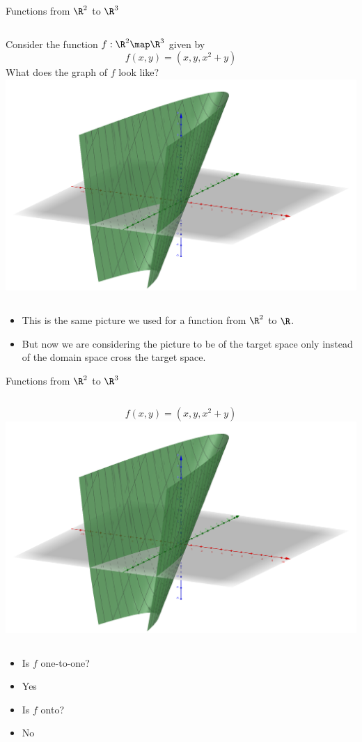 \documentclass{beamer}
\begin{document}
\begin{frame}{Functions from $\R^2$ to $\R^3$}

\begin{columns}
\column[T]{5cm}
Consider the function $f:\R^2\map\R^3$ given by
$$f(x,y) = (x , y, x^2 + y)$$
What does the graph of $f$ look like?
\column[T]{5cm}
\includegraphics[scale=0.15]{x-squared-plus-y}
\end{columns}

\begin{itemize}
\item This is the same picture we used for a function from $\R^2$ to $\R$.
\item But now we are considering the picture to be of the target space
only instead of the domain space cross the target space.
\end{itemize}
\end{frame}

\begin{frame}{Functions from $\R^2$ to $\R^3$}

\begin{columns}
\column[T]{5cm}
$$f(x,y) = (x, y, x^2 + y)$$
\column[T]{5cm}
\includegraphics[scale=0.15]{x-squared-plus-y}
\end{columns}

\begin{itemize}
\item Is $f$ one-to-one?
\item Yes
\item Is $f$ onto?
\item No
\end{itemize}

\end{frame}
\end{document}
